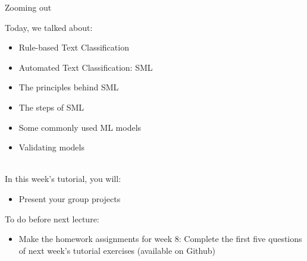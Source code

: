 \documentclass[handout]{beamer}
\begin{document}
\begin{frame}{Zooming out} 
	
Today, we talked about:
\begin{itemize}
	\item Rule-based Text Classification
	\item Automated Text Classification: SML
	\item The principles behind SML
	\item The steps of SML
	\item Some commonly used ML models
	\item Validating models \\\
\end{itemize}

In this week's tutorial, you will:
\begin{itemize}
	\item Present your group projects
\end{itemize}
	
\end{frame}


\begin{frame}
	
To do before next lecture:
	\begin{itemize}
		\item Make the homework assignments for week 8: Complete the first five questions of next week's tutorial exercises (available on Github)
	\end{itemize}
	
\end{frame}



	
\end{document}
